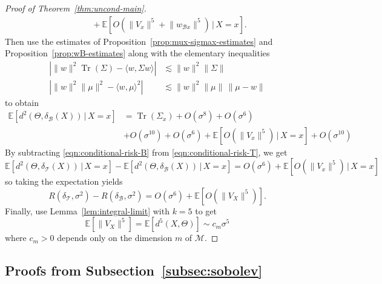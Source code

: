 \documentclass[preprint]{imsart}
\theoremstyle{plain}
\theoremstyle{definition}
\newcommand{\Ebb}{\mathbb{E}}
\newcommand{\Mcal}{\mathcal{M}}
\newcommand{\trace}{\operatorname{Tr}}
\newcommand{\B}{\mathcal{B}}
\newcommand{\T}{\mathcal{T}}
\begin{document}
\begin{appendix}
\begin{proof}[Proof of Theorem~\ref{thm:uncond-main}]
\begin{equation*}
\begin{split}
            &\qquad+ \Ebb\left[O\!\left(\lVert V_x\rVert^5+\lVert  w_{\B x}\rVert^5\right)\,|\,X=x\right].
        \end{split}
    \end{equation*}
    Then use the estimates of Proposition~\ref{prop:mux-sigmax-estimates} and Proposition~\ref{prop:wB-estimates} along with the elementary inequalities
    \begin{align*}
        \left|\|w\|^2\trace(\Sigma)-\langle w,\Sigma w\rangle\right| &\lesssim \|w\|^2\|\Sigma\| \\
        \left|\|w\|^2\|\mu\|^2-\langle w,\mu\rangle^2\right| &\lesssim \|w\|^2\|\mu\|\,\|\mu-w\|
    \end{align*}
    to obtain
    \begin{equation}\label{eqn:conditional-risk-B}
        \begin{split}
            \Ebb[d^2(\Theta,\delta_{\B}(X))\,|\,X=x] &= \trace(\Sigma_x) + O(\sigma^8) + O(\sigma^6) \\
            &+ O(\sigma^{10}) + O(\sigma^{6}) + \Ebb\left[O\!\left(\lVert V_x\rVert^5\right)\,|\,X=x\right] + O(\sigma^{10})   
        \end{split}
    \end{equation}    
    By subtracting \eqref{eqn:conditional-risk-B} from \eqref{eqn:conditional-risk-T}, we get
    \begin{equation*}
        \Ebb[d^2(\Theta,\delta_{\T}(X))\,|\,X=x]  - \Ebb[d^2(\Theta,\delta_{\B}(X))\,|\,X=x] = O(\sigma^{6}) + \Ebb\left[O\!\left(\lVert V_x\rVert^5\right)\,|\,X=x\right]
    \end{equation*}
    so taking the expectation yields
    \begin{equation*}
        R(\delta_{\T},\sigma^2) - R(\delta_{\B},\sigma^2) = O(\sigma^6) + \Ebb\left[O\!\left(\lVert V_X\rVert^5\right)\right].
    \end{equation*}
    Finally, use Lemma~\ref{lem:integral-limit} with $k=5$ to get
    \begin{equation*}
        \Ebb[\|V_X\|^5] = \Ebb[d^5(X,\Theta)] \sim c_m\sigma^5
    \end{equation*}
    where $c_m>0$ depends only on the dimension $m$ of $\Mcal$.
\end{proof}


\subsection{Proofs from Subsection~\ref{subsec:sobolev}}\label{subsec:proofs-sobolev}


\end{appendix}
\end{document}
